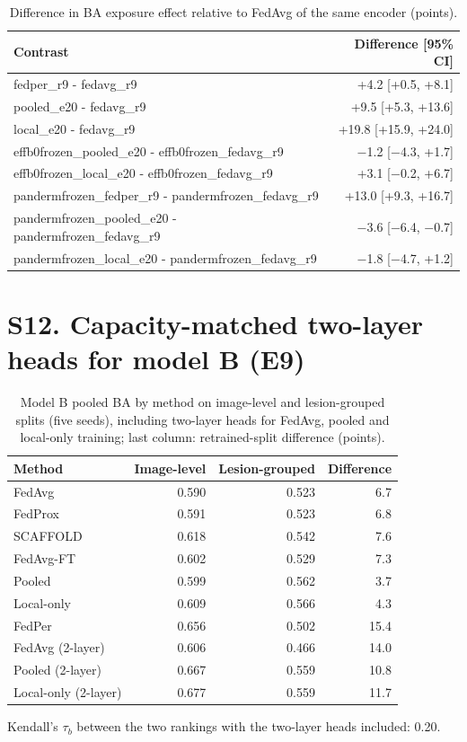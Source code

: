 \documentclass[10pt]{article}
\begin{document}
\begin{table}[!htbp]
\centering
\scriptsize
\caption{Difference in BA exposure effect relative to FedAvg of the same encoder (points).}
\label{tab:s11c}
\begin{tabular}{@{}lr@{}}
\toprule
Contrast & Difference [95\% CI] \\
\midrule
fedper\_r9 - fedavg\_r9 & +4.2 [+0.5, +8.1] \\
pooled\_e20 - fedavg\_r9 & +9.5 [+5.3, +13.6] \\
local\_e20 - fedavg\_r9 & +19.8 [+15.9, +24.0] \\
effb0frozen\_pooled\_e20 - effb0frozen\_fedavg\_r9 & $-$1.2 [$-$4.3, +1.7] \\
effb0frozen\_local\_e20 - effb0frozen\_fedavg\_r9 & +3.1 [$-$0.2, +6.7] \\
pandermfrozen\_fedper\_r9 - pandermfrozen\_fedavg\_r9 & +13.0 [+9.3, +16.7] \\
pandermfrozen\_pooled\_e20 - pandermfrozen\_fedavg\_r9 & $-$3.6 [$-$6.4, $-$0.7] \\
pandermfrozen\_local\_e20 - pandermfrozen\_fedavg\_r9 & $-$1.8 [$-$4.7, +1.2] \\
\bottomrule
\end{tabular}
\end{table}
\section*{S12. Capacity-matched two-layer heads for model B (E9)}
\begin{table}[!htbp]
\centering
\footnotesize
\caption{Model B pooled BA by method on image-level and lesion-grouped splits (five seeds), including two-layer heads for FedAvg, pooled and local-only training; last column: retrained-split difference (points).}
\label{tab:s12}
\begin{tabular}{@{}lrrr@{}}
\toprule
Method & Image-level & Lesion-grouped & Difference \\
\midrule
FedAvg & 0.590 & 0.523 & 6.7 \\
FedProx & 0.591 & 0.523 & 6.8 \\
SCAFFOLD & 0.618 & 0.542 & 7.6 \\
FedAvg-FT & 0.602 & 0.529 & 7.3 \\
Pooled & 0.599 & 0.562 & 3.7 \\
Local-only & 0.609 & 0.566 & 4.3 \\
FedPer & 0.656 & 0.502 & 15.4 \\
FedAvg (2-layer) & 0.606 & 0.466 & 14.0 \\
Pooled (2-layer) & 0.667 & 0.559 & 10.8 \\
Local-only (2-layer) & 0.677 & 0.559 & 11.7 \\
\bottomrule
\end{tabular}
\end{table}
Kendall's $\tau_b$ between the two rankings with the two-layer heads included: 0.20.
\end{document}
